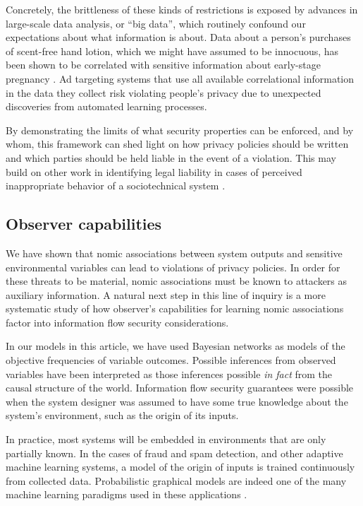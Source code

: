 \documentclass[../thesis.tex]{subfiles}
\begin{document}
Concretely, the brittleness of these kinds of
restrictions is exposed
by advances in large-scale data analysis, or ``big data'',
which routinely confound our expectations about what
information is about.
Data about a person's purchases of scent-free hand lotion,
which we might have assumed to be innocuous, has been
shown to be correlated with sensitive information about
early-stage pregnancy \cite{hill12forbes}.
Ad targeting systems that use all available
correlational information in the data they collect risk
violating people's privacy due to unexpected discoveries
from automated learning processes.

By demonstrating the limits of what security properties
can be enforced, and by whom, this framework can
shed light on how privacy policies should be written
and which parties should be held liable in the event
of a violation.
This may build on other work in identifying legal
liability in cases of perceived inappropriate behavior
of a sociotechnical system \cite{datta2018discrimination}.

\subsection{Observer capabilities}
\label{sec:observer-capabilities}

We have shown that nomic associations between
system outputs and sensitive environmental variables
can lead to violations of privacy policies.
In order for these threats to be material,
nomic associations must be known to attackers
as auxiliary information.
A natural next step in this line of inquiry
is a more systematic study of how
observer's capabilities for learning nomic associations
factor into information flow security considerations.

In our models in this article, we have used
Bayesian networks as models of the objective
frequencies of variable outcomes.
Possible inferences from observed variables
have been interpreted as those inferences
possible \emph{in fact} from the causal
structure of the world.
Information flow security guarantees were
possible when the system designer was
assumed to have some true knowledge about
the system's environment, such as the
origin of its inputs.

In practice, most systems will be embedded in
environments that are only partially known.
In the cases of fraud and spam detection,
and other adaptive machine learning systems,
a model of the origin of inputs is trained
continuously from collected data.
Probabilistic graphical models are indeed
one of the many machine learning paradigms
used in these applications \cite{bishop2006pattern}.
\end{document}
